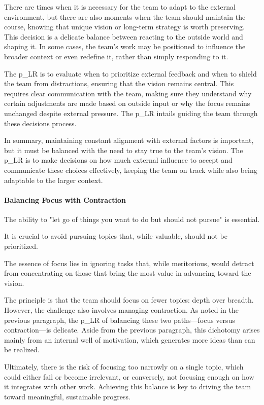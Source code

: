 There are times when it is necessary for the team to adapt to the external environment, but there are also moments when the team should maintain the course, knowing that unique vision or long-term strategy is worth preserving. This decision is a delicate balance between reacting to the outside world and shaping it. In some cases, the team’s work may be positioned to influence the broader context or even redefine it, rather than simply responding to it.

The \gls{p_LR} is to evaluate when to prioritize external feedback and when to shield the team from distractions, ensuring that the vision remains central. This requires clear communication with the team, making sure they understand why certain adjustments are made based on outside input or why the focus remains unchanged despite external pressure. The \gls{p_LR} intails guiding the team through these decisions process.

In summary, maintaining constant alignment with external factors is important, but it must be balanced with the need to stay true to the team’s vision. The \gls{p_LR} is to make decisions on how much external influence to accept and communicate these choices effectively, keeping the team on track while also being adaptable to the larger context.

\paragraph{Balancing Focus with Contraction}

The ability to "let go of things you want to do but should not pursue" is essential.

It is crucial to avoid pursuing topics that, while valuable, should not be prioritized. \begin{center} The essence of focus lies in ignoring tasks that, while meritorious, would detract from concentrating on those that bring the most value in advancing toward the vision. \end{center}

The principle is that the team should focus on fewer topics: depth over breadth. However, the challenge also involves managing contraction. As noted in the previous paragraph, the \gls{p_LR} of balancing these two paths—focus versus contraction—is delicate. Aside from the previous paragraph, this dichotomy arises mainly from an internal well of motivation, which generates more ideas than can be realized.

Ultimately, there is the risk of focusing too narrowly on a single topic, which could either fail or become irrelevant, or conversely, not focusing enough on how it integrates with other work. Achieving this balance is key to driving the team toward meaningful, sustainable progress.

